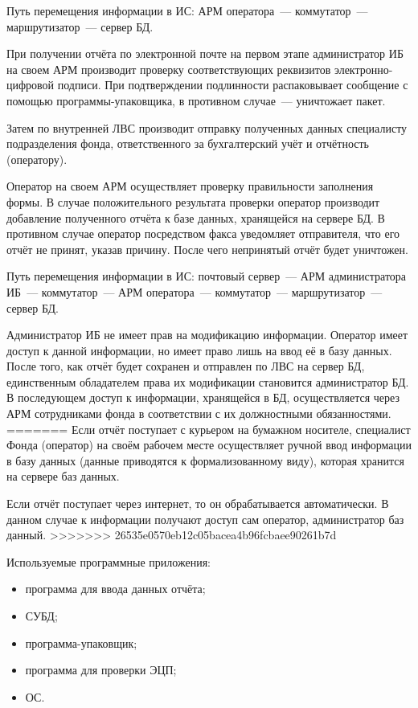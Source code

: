 \point Путь перемещения информации в ИС: АРМ оператора~---
коммутатор~--- маршрутизатор~--- сервер БД.

\point При получении отчёта по электронной почте на первом этапе
администратор ИБ на своем АРМ производит проверку соответствующих
реквизитов электронно-цифровой подписи. При подтверждении подлинности
распаковывает сообщение с помощью программы-упаковщика, в противном
случае~--- уничтожает пакет.

Затем по внутренней ЛВС производит отправку полученных данных
специалисту подразделения фонда, ответственного за бухгалтерский учёт
и отчётность (оператору).

Оператор на своем АРМ осуществляет проверку правильности заполнения
формы. В случае положительного результата проверки оператор производит
добавление полученного отчёта к базе данных, хранящейся на сервере БД.
В противном случае оператор посредством факса уведомляет отправителя,
что его отчёт не принят, указав причину. После чего непринятый отчёт
будет уничтожен.

\point Путь перемещения информации в ИС: почтовый сервер~--- АРМ
администратора ИБ~--- коммутатор~--- АРМ оператора~--- коммутатор~---
маршрутизатор~--- сервер БД.

\point Администратор ИБ не имеет прав на модификацию
информации. Оператор имеет доступ к данной информации, но имеет право
лишь на ввод её в базу данных. После того, как отчёт будет сохранен и
отправлен по ЛВС на сервер БД, единственным обладателем права их
модификации становится администратор БД. В последующем доступ к
информации, хранящейся в БД, осуществляется через АРМ сотрудниками
фонда в соответствии с их должностными обязанностями.
=======
\point Если отчёт поступает с курьером на бумажном носителе, специалист Фонда (оператор) на своём рабочем месте осуществляет ручной ввод информации в базу данных (данные приводятся к формализованному виду), которая хранится на сервере баз данных.

Если отчёт поступает через интернет, то он обрабатывается автоматически. В данном случае к информации получают доступ сам оператор, администратор баз данный.
>>>>>>> 26535e0570eb12c05bacea4b96fcbaee90261b7d

\point Используемые программные приложения:

\begin{itemize}
\item программа для ввода данных отчёта;
\item СУБД;
\item программа-упаковщик;
\item программа для проверки ЭЦП;
\item ОС.
\end{itemize}


